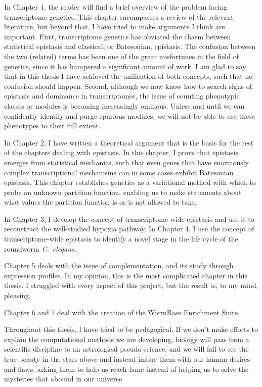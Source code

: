 \documentclass[12pt]{caltech_thesis}
\newcommand{\cel}{\emph{C.~elegans}}
\begin{document}
In Chapter 1, the reader will find a brief overview of the problem facing
transcriptome genetics. This chapter encompasses a review of the relevant
literature, but beyond that, I have tried to make arguments I think are
important. First, transcriptome genetics has obviated the chasm between
statistical epistasis and classical, or Batesonian, epistasis. The confusion
between the two (related) terms has been one of the great misfortunes in the
field of genetics, since it has hampered a significant amount of work. I am glad
to say that in this thesis I have achieved the unification of both concepts,
such that no confusion should happen. Second, although we now know how to search
signs of epistasis and dominance in transcriptomes, the issue of counting
phenotypic classes or modules is becoming increasingly ominous. Unless and until
we can confidently identify and purge spurious modules, we will not be able to
use these phenotypes to their full extent.

In Chapter 2, I have written a theoretical argument that is the basis for the
rest of the chapters dealing with epistasis. In this chapter, I prove that
epistasis emerges from statistical mechanics, such that even genes that have
enormously complex transcriptional mechanisms can in some cases exhibit
Batesonian epistasis. This chapter establishes genetics as a variational method
with which to probe an unknown partition function, enabling us to make statements
about what values the partition function is or is not allowed to take.

In Chapter 3, I develop the concept of transcriptome-wide epistasis and use
it to reconstruct the well-studied hypoxia pathway. In Chapter 4, I use the
concept of transcriptome-wide epistasis to identify a novel stage in the life
cycle of the roundworm \cel{}.

Chapter 5 deals with the issue of complementation, and its study through
expression profiles. In my opinion, this is the most complicated chapter in this
thesis. I struggled with every aspect of this project, but the result is, to my
mind, pleasing.

Chapter 6 and 7 deal with the creation of the WormBase Enrichment Suite.

Throughout this thesis, I have tried to be pedagogical. If we don't make efforts
to explain the computational methods we are developing, biology will pass from
a scientific discipline to an astrological pseudo-science, and we will fail to
see the true beauty in the stars above and instead imbue them with our human
desires and flaws, asking them to help us reach fame instead of helping us to
solve the mysteries that abound in our universe.
\end{document}
